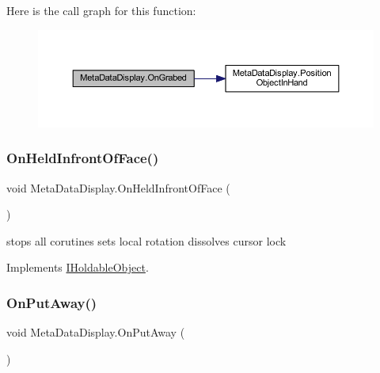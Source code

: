 Here is the call graph for this function\+:
\nopagebreak
\begin{figure}[H]
\begin{center}
\leavevmode
\includegraphics[width=350pt]{class_meta_data_display_a7d639d7bc58c9340a7f5274884bbc11d_cgraph}
\end{center}
\end{figure}
\mbox{\label{class_meta_data_display_ab91c62e23ca6af27f8a30859d5a172c9}} 
\subsubsection{\texorpdfstring{On\+Held\+Infront\+Of\+Face()}{OnHeldInfrontOfFace()}}
{\footnotesize\ttfamily void Meta\+Data\+Display.\+On\+Held\+Infront\+Of\+Face (\begin{DoxyParamCaption}{ }\end{DoxyParamCaption})}



stops all corutines sets local rotation dissolves cursor lock 



Implements \mbox{\hyperlink{interface_i_holdable_object_a6f63fec8fb8f715ad5cdd08aa5ec0ea5}{I\+Holdable\+Object}}.

\mbox{\label{class_meta_data_display_a55888c6c3e3e224d89d95b6c63652762}} 
\subsubsection{\texorpdfstring{On\+Put\+Away()}{OnPutAway()}}
{\footnotesize\ttfamily void Meta\+Data\+Display.\+On\+Put\+Away (\begin{DoxyParamCaption}{ }\end{DoxyParamCaption})}



